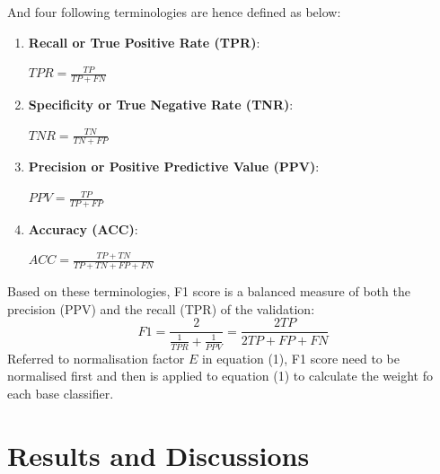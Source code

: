 \documentclass[10pt,journal,compsoc]{IEEEtran}
\begin{document}
And four following terminologies are hence defined as below:
\begin{enumerate}[label=\alph*)]
\item \textbf{ Recall or True Positive Rate (TPR)}: \\ 
		\begin{center} $\displaystyle TPR = \frac{TP}{TP + FN} $ \end{center}
\item \textbf{Specificity or True Negative Rate (TNR)}: \\ 
		\begin{center} $\displaystyle TNR = \frac{TN}{TN + FP} $ \end{center}
\item \textbf{Precision or Positive Predictive Value (PPV)}: \\
		\begin{center} $\displaystyle PPV = \frac{TP}{TP + FP} $ \end{center}
\item \textbf{Accuracy (ACC)}: \\ 
		\begin{center} $\displaystyle ACC = \frac{TP + TN}{TP + TN + FP + FN} $\\ \end{center} 
\end{enumerate}

Based on these terminologies, F1 score is a balanced measure of both the precision (PPV) and the recall (TPR) of the validation: 
\begin{equation}\label{reio}
	F1 = \frac{2 }{\frac{1}{TPR} + \frac{1}{PPV}} = \frac{2TP}{2TP + FP + FN}
\end{equation}
Referred to normalisation factor $E$ in equation (1), F1 score need to be normalised first and then is applied to equation (1) to calculate the weight fo each base classifier. 

%
%
%
%
%
%
%
\section{Results and Discussions}
\end{document}
